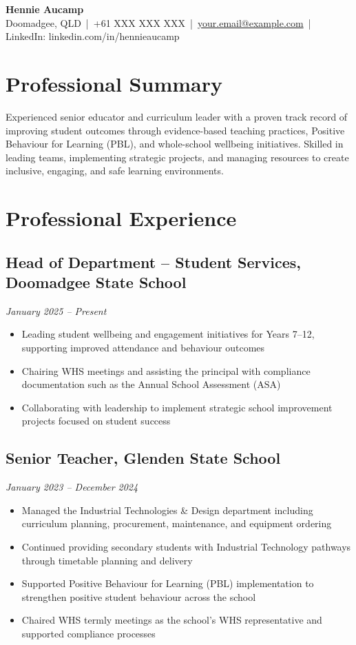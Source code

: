 \documentclass[11pt,a4paper]{article}
\newcommand{\contact}[5]{
    \begin{center}
        {\Huge \textbf{#1}} \\[8pt]
        #2 \,|\, #3 \,|\, \href{mailto:#4}{#4} \,|\, #5
    \end{center}
    \vspace{0.5cm}
}
\begin{document}
\contact{Hennie Aucamp}
{Doomadgee, QLD}
{+61 XXX XXX XXX}
{your.email@example.com}
{LinkedIn: linkedin.com/in/hennieaucamp}

\section*{Professional Summary}
Experienced senior educator and curriculum leader with a proven track record of improving student outcomes through evidence-based teaching practices, Positive Behaviour for Learning (PBL), and whole-school wellbeing initiatives. Skilled in leading teams, implementing strategic projects, and managing resources to create inclusive, engaging, and safe learning environments.

\section*{Professional Experience}

\subsection*{Head of Department – Student Services, Doomadgee State School}
\textit{January 2025 – Present}
\begin{itemize}
    \item Leading student wellbeing and engagement initiatives for Years 7–12, supporting improved attendance and behaviour outcomes
    \item Chairing WHS meetings and assisting the principal with compliance documentation such as the Annual School Assessment (ASA)
    \item Collaborating with leadership to implement strategic school improvement projects focused on student success
\end{itemize}

\subsection*{Senior Teacher, Glenden State School}
\textit{January 2023 – December 2024}
\begin{itemize}
    \item Managed the Industrial Technologies \& Design department including curriculum planning, procurement, maintenance, and equipment ordering
    \item Continued providing secondary students with Industrial Technology pathways through timetable planning and delivery
    \item Supported Positive Behaviour for Learning (PBL) implementation to strengthen positive student behaviour across the school
    \item Chaired WHS termly meetings as the school's WHS representative and supported compliance processes
\end{itemize}
\end{document}
